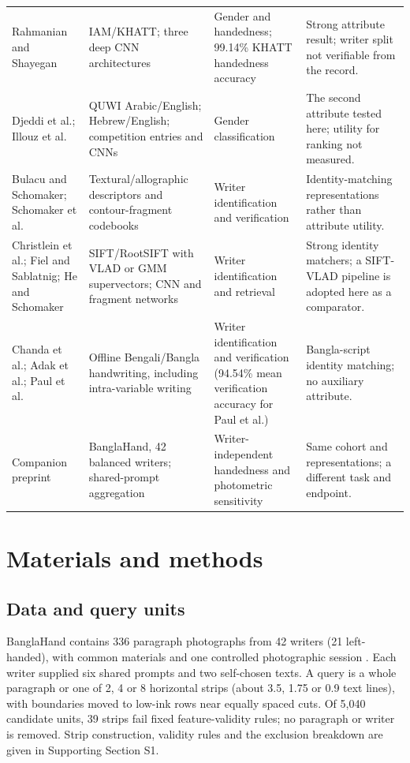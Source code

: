 \documentclass[ASNA,twocolumn]{USG}
\begin{document}
\begin{table}[!t]
\begin{tabularx}{\textwidth}{@{}>{\raggedright\arraybackslash}p{}>{\raggedright\arraybackslash}p{}>{\raggedright\arraybackslash}p{}>{\raggedright\arraybackslash}X@{}}
Rahmanian and Shayegan \cite{rahmanian2021handedness} & IAM/KHATT; three deep CNN architectures & Gender and handedness; 99.14\% KHATT handedness accuracy & Strong attribute result; writer split not verifiable from the record.\\
Djeddi et al.; Illouz et al.\ \cite{djeddi2015icdar,illouz2018gender} & QUWI Arabic/English; Hebrew/English; competition entries and CNNs & Gender classification & The second attribute tested here; utility for ranking not measured.\\
Bulacu and Schomaker; Schomaker et al.\ \cite{bulacu2007text,schomaker2007codebooks} & Textural/allographic descriptors and contour-fragment codebooks & Writer identification and verification & Identity-matching representations rather than attribute utility.\\
Christlein et al.; Fiel and Sablatnig; He and Schomaker \cite{christlein2017gmm,christlein2017unsupervised,fiel2015cnn,he2020fragnet} & SIFT/RootSIFT with VLAD or GMM supervectors; CNN and fragment networks & Writer identification and retrieval & Strong identity matchers; a SIFT-VLAD pipeline is adopted here as a comparator.\\
Chanda et al.; Adak et al.; Paul et al.\ \cite{chanda2010bengali,adak2019intravariable,paul2024bangla} & Offline Bengali/Bangla handwriting, including intra-variable writing & Writer identification and verification (94.54\% mean verification accuracy for Paul et al.) & Bangla-script identity matching; no auxiliary attribute.\\
Companion preprint \cite{prappo2026handedness} & BanglaHand, 42 balanced writers; shared-prompt aggregation & Writer-independent handedness and photometric sensitivity & Same cohort and representations; a different task and endpoint.\\\bottomrule
\end{tabularx}
\end{table}

\section{Materials and methods}
\label{sec:protocol}
\subsection{Data and query units}
BanglaHand contains 336 paragraph photographs from 42 writers (21 left-handed), with common materials and one controlled photographic session \cite{banglahand2026data}. Each writer supplied six shared prompts and two self-chosen texts. A query is a whole paragraph or one of 2, 4 or 8 horizontal strips (about 3.5, 1.75 or 0.9 text lines), with boundaries moved to low-ink rows near equally spaced cuts. Of 5,040 candidate units, 39 strips fail fixed feature-validity rules; no paragraph or writer is removed. Strip construction, validity rules and the exclusion breakdown are given in Supporting Section S1.
\end{document}
